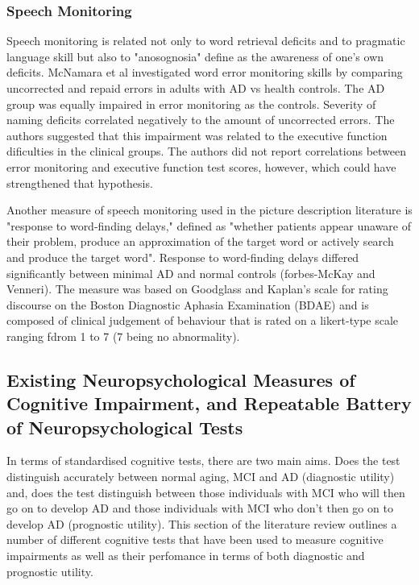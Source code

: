 \documentclass{article}
\begin{document}
\subsubsection{Speech Monitoring}
Speech monitoring is related not only to word retrieval deficits and to pragmatic language skill but also to "anosognosia" define as the awareness of one's own deficits. McNamara et al investigated word error monitoring skills by comparing uncorrected and repaid errors in adults with AD vs health controls. The AD group was equally impaired in error monitoring as the controls. Severity of naming deficits correlated negatively to the amount of uncorrected errors. The authors suggested that this impairment was related to the executive function dificulties in the clinical groups. The authors did not report correlations between error monitoring and executive function test scores, however, which could have strengthened that hypothesis. \newline
\par
Another measure of speech monitoring used in the picture description literature is "response to word-finding delays," defined as "whether patients appear unaware of their problem, produce an approximation of the target word or actively search and produce the target word". Response to word-finding delays differed significantly between minimal  AD and normal controls (forbes-McKay and Venneri). The measure was based on Goodglass and Kaplan's scale for rating discourse on the Boston Diagnostic Aphasia Examination (BDAE) and is composed of clinical judgement of behaviour that is rated on a likert-type scale ranging fdrom 1 to 7 (7 being no abnormality).

\subsection{Existing Neuropsychological Measures of Cognitive Impairment, and Repeatable Battery of Neuropsychological Tests}
In terms of standardised cognitive tests, there are two main aims. Does the test distinguish accurately between normal aging, MCI and AD (diagnostic utility) and, does the test distinguish between those individuals with MCI who will then go on to develop AD and those individuals with MCI who don't then go on to develop AD (prognostic utility). This section of the literature review outlines a number of different cognitive tests that have been used to measure cognitive impairments as well as their perfomance in terms of both diagnostic and prognostic utility. \newline
\par 
\end{document}
